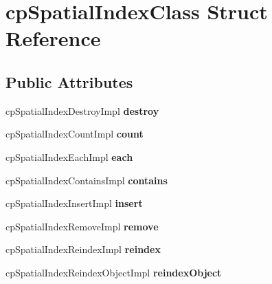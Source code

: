 \hypertarget{structcp_spatial_index_class}{}\section{cp\+Spatial\+Index\+Class Struct Reference}
\label{structcp_spatial_index_class}
\subsection*{Public Attributes}
\begin{DoxyCompactItemize}
\item 
\mbox{\label{structcp_spatial_index_class_aa81432518e81917cf388f020aa0fe766}} 
cp\+Spatial\+Index\+Destroy\+Impl {\bfseries destroy}
\item 
\mbox{\label{structcp_spatial_index_class_a611148802f63840b1c4f8a06feacd2eb}} 
cp\+Spatial\+Index\+Count\+Impl {\bfseries count}
\item 
\mbox{\label{structcp_spatial_index_class_a642ebf6c60ed3edc7da5ac477c496b61}} 
cp\+Spatial\+Index\+Each\+Impl {\bfseries each}
\item 
\mbox{\label{structcp_spatial_index_class_a08dc3736b831e921426fbb28297494e1}} 
cp\+Spatial\+Index\+Contains\+Impl {\bfseries contains}
\item 
\mbox{\label{structcp_spatial_index_class_a5d8a8d121853ae7bcbf934e4483daa26}} 
cp\+Spatial\+Index\+Insert\+Impl {\bfseries insert}
\item 
\mbox{\label{structcp_spatial_index_class_a420112b7d2c3d6faf07f88db697aa369}} 
cp\+Spatial\+Index\+Remove\+Impl {\bfseries remove}
\item 
\mbox{\label{structcp_spatial_index_class_acd833dc0dd2f73e703a5c4263bbf4655}} 
cp\+Spatial\+Index\+Reindex\+Impl {\bfseries reindex}
\item 
\mbox{\label{structcp_spatial_index_class_ae727936ae5fdcb723c9aea0577083bf6}} 
cp\+Spatial\+Index\+Reindex\+Object\+Impl {\bfseries reindex\+Object}

\end{DoxyCompactItemize}
